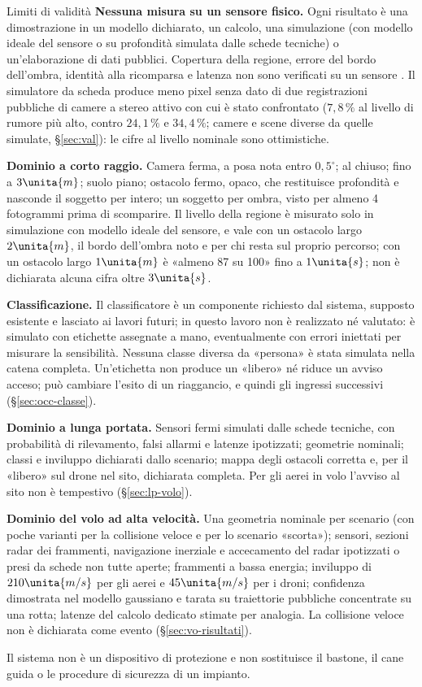 \begin{riquadro}{Limiti di validità}
\textbf{Nessuna misura su un sensore fisico.} Ogni risultato è una dimostrazione in un modello dichiarato, un calcolo, una simulazione (con modello ideale del sensore o su profondità simulata dalle schede tecniche) o un'elaborazione di dati pubblici. Copertura della regione, errore del bordo dell'ombra, identità alla ricomparsa e latenza non sono verificati su un sensore . Il simulatore da scheda produce meno pixel senza dato di due registrazioni pubbliche di camere a stereo attivo con cui è stato confrontato ($7{,}8\,\%$ al livello di rumore più alto, contro $24{,}1\,\%$ e $34{,}4\,\%$; camere e scene diverse da quelle simulate, \S\ref{sec:val}): le cifre al livello nominale sono ottimistiche.

\textbf{Dominio a corto raggio.} Camera ferma, a posa nota entro $0{,}5^\circ$; al chiuso; fino a $3\unita{m}$; suolo piano; ostacolo fermo, opaco, che restituisce profondità e nasconde il soggetto per intero; un soggetto per ombra, visto per almeno 4 fotogrammi prima di scomparire. Il livello della regione è misurato solo in simulazione con modello ideale del sensore, e vale con un ostacolo largo $2\unita{m}$, il bordo dell'ombra noto e per chi resta sul proprio percorso; con un ostacolo largo $1\unita{m}$ è «almeno 87 su 100» fino a $1\unita{s}$; non è dichiarata alcuna cifra oltre $3\unita{s}$.

\textbf{Classificazione.} Il classificatore è un componente richiesto dal sistema, supposto esistente e lasciato ai lavori futuri; in questo lavoro non è realizzato né valutato: è simulato con etichette assegnate a mano, eventualmente con errori iniettati per misurare la sensibilità. Nessuna classe diversa da «persona» è stata simulata nella catena completa. Un'etichetta non produce un «libero» né riduce un avviso acceso; può cambiare l'esito di un riaggancio, e quindi gli ingressi successivi (\S\ref{sec:occ-classe}).

\textbf{Dominio a lunga portata.} Sensori fermi simulati dalle schede tecniche, con probabilità di rilevamento, falsi allarmi e latenze ipotizzati; geometrie nominali; classi e inviluppo dichiarati dallo scenario; mappa degli ostacoli corretta e, per il «libero» sul drone nel sito, dichiarata completa. Per gli aerei in volo l'avviso al sito non è tempestivo (\S\ref{sec:lp-volo}).

\textbf{Dominio del volo ad alta velocità.} Una geometria nominale per scenario (con poche varianti per la collisione veloce e per lo scenario «scorta»); sensori, sezioni radar dei frammenti, navigazione inerziale e accecamento del radar ipotizzati o presi da schede non tutte aperte; frammenti a bassa energia; inviluppo di $210\unita{m/s}$ per gli aerei e $45\unita{m/s}$ per i droni; confidenza dimostrata nel modello gaussiano e tarata su traiettorie pubbliche concentrate su una rotta; latenze del calcolo dedicato stimate per analogia. La collisione veloce non è dichiarata come evento (\S\ref{sec:vo-risultati}).

Il sistema non è un dispositivo di protezione e non sostituisce il bastone, il cane guida o le procedure di sicurezza di un impianto.
\end{riquadro}

